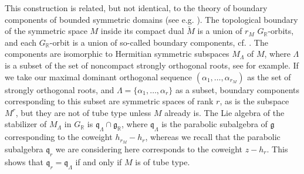 \begin{remark}
This construction is related, but not identical, to the theory of boundary components of bounded symmetric domains (see e.g. \cite{jep93Wol72,jep93PS69,jep93Sat80,jep93AMRT10}). The topological boundary of the symmetric space $M$ inside its compact dual $\check M$ is a union of $r_M$ $G_{\mathbb R}$-orbits, and each $G_{\mathbb R}$-orbit is a union of so-called boundary components, cf. \cite[Def.~3.2 p.~127]{jep93AMRT10}. The components are isomorphic to Hermitian symmetric subspaces $M_\Lambda$ of $M$, where $\Lambda$ is a subset of the set of noncompact strongly orthogonal roots, see \cite[Th.~3.3 p.~127]{jep93AMRT10} for example. If we take our maximal dominant orthogonal sequence $(\alpha_1,\ldots,\alpha_{r_M})$ as the set of strongly orthogonal roots, and $\Lambda=\{\alpha_1,\ldots,\alpha_r\}$ as a subset, boundary components corresponding to this subset are symmetric spaces of rank $r$, as is the subspace $M^r$, but they are not of tube type unless $M$ already is. The Lie algebra of the stabilizer of $M_\Lambda$ in $G_{\mathbb R}$ is $\mathfrak q_\Lambda\cap\mathfrak g_{\mathbb R}$, where $\mathfrak q_\Lambda$ is the parabolic subalgebra of $\mathfrak g$ corresponding to the coweight $h_{r_M}-h_r$, whereas we recall that the parabolic subalgebra $\mathfrak q_r$ we are considering here corresponds to the coweight $z-h_r$. This shows that $\mathfrak q_r=\mathfrak q_\Lambda$ if and only if $M$ is of tube type.
\end{remark}
\clearpage

